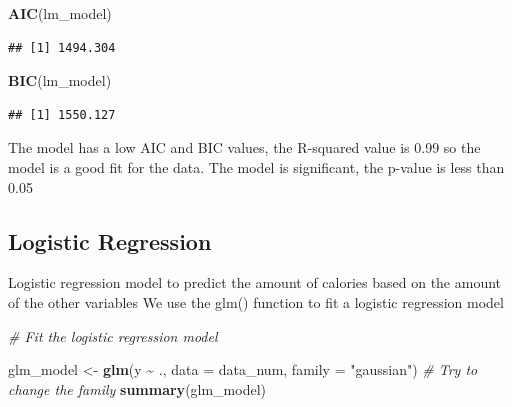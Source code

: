 \documentclass[
]{article}
\newenvironment{Shaded}{\begin{snugshade}}{\end{snugshade}}
\newcommand{\AttributeTok}[1]{\textcolor[rgb]{0.13,0.29,0.53}{#1}}
\newcommand{\CommentTok}[1]{\textcolor[rgb]{0.56,0.35,0.01}{\textit{#1}}}
\newcommand{\FunctionTok}[1]{\textcolor[rgb]{0.13,0.29,0.53}{\textbf{#1}}}
\newcommand{\NormalTok}[1]{#1}
\newcommand{\OtherTok}[1]{\textcolor[rgb]{0.56,0.35,0.01}{#1}}
\newcommand{\SpecialCharTok}[1]{\textcolor[rgb]{0.81,0.36,0.00}{\textbf{#1}}}
\newcommand{\StringTok}[1]{\textcolor[rgb]{0.31,0.60,0.02}{#1}}
\begin{document}
\begin{Shaded}
\begin{Highlighting}[]
\FunctionTok{AIC}\NormalTok{(lm\_model)}
\end{Highlighting}
\end{Shaded}

\begin{verbatim}
## [1] 1494.304
\end{verbatim}

\begin{Shaded}
\begin{Highlighting}[]
\FunctionTok{BIC}\NormalTok{(lm\_model)}
\end{Highlighting}
\end{Shaded}

\begin{verbatim}
## [1] 1550.127
\end{verbatim}

The model has a low AIC and BIC values, the R-squared value is 0.99 so
the model is a good fit for the data. The model is significant, the
p-value is less than 0.05

\subsection{Logistic Regression}\label{logistic-regression}

Logistic regression model to predict the amount of calories based on the
amount of the other variables We use the glm() function to fit a
logistic regression model

\begin{Shaded}
\begin{Highlighting}[]
\CommentTok{\# Fit the logistic regression model}

\NormalTok{glm\_model }\OtherTok{\textless{}{-}} \FunctionTok{glm}\NormalTok{(y }\SpecialCharTok{\textasciitilde{}}\NormalTok{ ., }\AttributeTok{data =}\NormalTok{ data\_num, }\AttributeTok{family =} \StringTok{"gaussian"}\NormalTok{) }
\CommentTok{\# Try to change the family}
\FunctionTok{summary}\NormalTok{(glm\_model)}
\end{Highlighting}
\end{Shaded}
\end{document}
